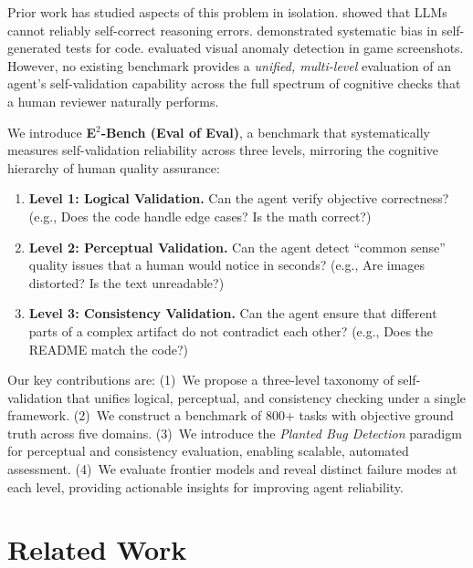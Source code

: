 \documentclass[11pt]{fairmeta}
\begin{document}
Prior work has studied aspects of this problem in isolation. \citet{huang2024selfverification} showed that LLMs cannot reliably self-correct reasoning errors. \citet{kamoi2024selftesting} demonstrated systematic bias in self-generated tests for code. \citet{glitchbench2024} evaluated visual anomaly detection in game screenshots. However, no existing benchmark provides a \textit{unified, multi-level} evaluation of an agent's self-validation capability across the full spectrum of cognitive checks that a human reviewer naturally performs.

We introduce \textbf{E$^2$-Bench (Eval of Eval)}, a benchmark that systematically measures self-validation reliability across three levels, mirroring the cognitive hierarchy of human quality assurance:

\begin{enumerate}[leftmargin=*]
    \item \textbf{Level 1: Logical Validation.} Can the agent verify objective correctness? (e.g., Does the code handle edge cases? Is the math correct?)
    \item \textbf{Level 2: Perceptual Validation.} Can the agent detect ``common sense'' quality issues that a human would notice in seconds? (e.g., Are images distorted? Is the text unreadable?)
    \item \textbf{Level 3: Consistency Validation.} Can the agent ensure that different parts of a complex artifact do not contradict each other? (e.g., Does the README match the code?)
\end{enumerate}

Our key contributions are: (1)~We propose a three-level taxonomy of self-validation that unifies logical, perceptual, and consistency checking under a single framework. (2)~We construct a benchmark of 800+ tasks with objective ground truth across five domains. (3)~We introduce the \textit{Planted Bug Detection} paradigm for perceptual and consistency evaluation, enabling scalable, automated assessment. (4)~We evaluate frontier models and reveal distinct failure modes at each level, providing actionable insights for improving agent reliability.

\section{Related Work}
\end{document}
